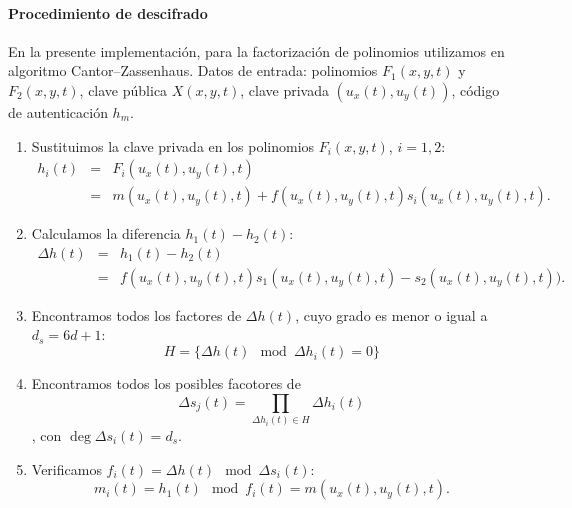 \documentclass[12pt]{article}
\begin{document}

\paragraph*{Procedimiento de descifrado}
\noindent

En la presente implementaci\'on, para la factorizaci\'on de polinomios utilizamos en algoritmo Cantor–Zassenhaus. Datos de entrada: polinomios $F_1(x,y,t)$ y $F_2(x,y,t)$, clave p\'ublica $X(x,y,t)$, clave privada $(u_x(t),u_y(t))$, c\'odigo de autenticaci\'on $h_m$.

\begin{enumerate}
\item Sustituimos la clave privada en los polinomios $F_i(x,y,t)$, $i=1,2$:
\begin{eqnarray*}
h_i(t)&=& F_i(u_x(t),u_y(t),t)\\
&=& m(u_x(t),u_y(t),t)+f(u_x(t),u_y(t),t)s_i(u_x(t),u_y(t),t).
\end{eqnarray*}
\item Calculamos la diferencia $h_1(t)-h_2(t)$:
\begin{eqnarray*}
\Delta h(t)&=& h_1(t)-h_2(t)\\
&=& f(u_x(t),u_y(t),t)s_1(u_x(t),u_y(t),t)-s_2(u_x(t),u_y(t),t)).
\end{eqnarray*}
\item Encontramos todos los factores de $\Delta h(t)$, cuyo grado es menor o igual a  $d_s=6d+1$:
$$H=\{ \Delta h(t) \mod \Delta h_i(t)=0\}$$

\item  Encontramos todos los posibles facotores de $$\Delta s_j(t)=\prod_{\Delta h_i(t)\in H}\Delta h_i(t)$$, con $\deg \Delta s_i(t) =d_s$. 

\item Verificamos $f_i(t)=\Delta h(t) \mod \Delta s_i(t)$:
$$m_i(t)=h_1(t) \mod f_i(t)=m(u_x(t),u_y(t),t).$$


\end{enumerate}
\end{document}

